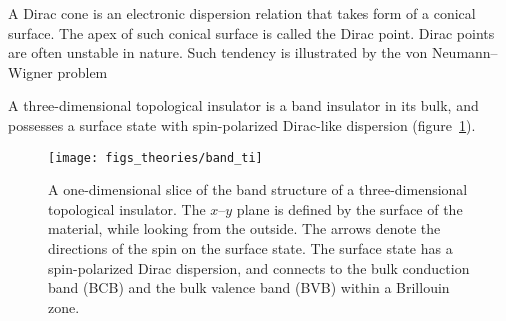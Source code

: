 A Dirac cone is an electronic dispersion relation that takes form of a conical surface. The apex of such conical surface is called the Dirac point. Dirac points are often unstable in nature. Such tendency is illustrated by the von Neumann--Wigner problem~\cite{vonNeumann1993, Asano2011}

A three-dimensional topological insulator is a band insulator in its bulk, and possesses a surface state with spin-polarized Dirac-like dispersion (figure~\ref{fig:bg_ti}). %
\begin{figure}[ht]%
    \centering%
    \texttt{[image: figs\_theories/band\_ti]}%
    \caption[Band structure of a 3D topological insulator]{\label{fig:bg_ti}A one-dimensional slice of the band structure of a three-dimensional topological insulator. The $x$--$y$ plane is defined by the surface of the material, while looking from the outside. The arrows denote the directions of the spin on the surface state. The surface state has a spin-polarized Dirac dispersion, and connects to the bulk conduction band (BCB) and the bulk valence band (BVB) within a Brillouin zone.}%
\end{figure}%
%
